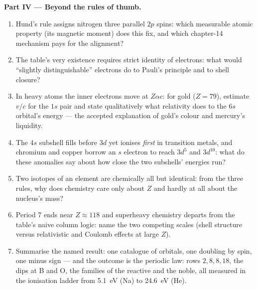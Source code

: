 \begin{problem}
\medskip\noindent\textbf{Part IV --- Beyond the rules of thumb.}
\begin{enumerate}[resume]
  \item Hund's rule assigns nitrogen three parallel $2p$ spins:
        which measurable atomic property (its magnetic moment)
        does this fix, and which chapter-14 mechanism pays for the
        alignment?
  \item The table's very existence requires strict identity of
        electrons: what would ``slightly distinguishable''
        electrons do to Pauli's principle and to shell closure?
  \item In heavy atoms the inner electrons move at $Z\alpha c$:
        for gold ($Z = 79$), estimate $v/c$ for the $1s$ pair and
        state qualitatively what relativity does to the $6s$
        orbital's energy --- the accepted explanation of gold's
        colour and mercury's liquidity.
  \item The $4s$ subshell fills before $3d$ yet ionises
        \emph{first} in transition metals, and chromium and copper
        borrow an $s$ electron to reach $3d^5$ and $3d^{10}$: what
        do these anomalies say about how close the two subshells'
        energies run?
  \item Two isotopes of an element are chemically all but
        identical: from the three rules, why does chemistry care
        only about $Z$ and hardly at all about the nucleus's mass?
  \item Period 7 ends near $Z \approx 118$ and superheavy
        chemistry departs from the table's naive column logic:
        name the two competing scales (shell structure versus
        relativistic and Coulomb effects at large $Z$).
  \item Summarise the named result: one catalogue of orbitals, one
        doubling by spin, one minus sign --- and the outcome is the
        periodic law: rows $2, 8, 8, 18$, the dips at B and O, the
        families of the reactive and the noble, all measured in
        the ionisation ladder from \qty{5.1}{eV} (Na) to
        \qty{24.6}{eV} (He).
\end{enumerate}
\end{problem}
